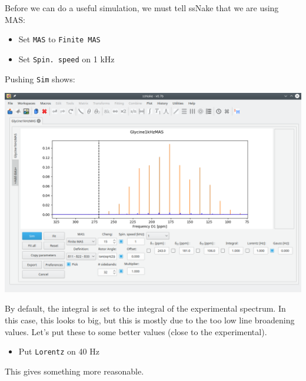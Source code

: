 \documentclass[11pt,a4paper]{article}
\begin{document}
Before we can do a useful simulation, we must tell ssNake that we are using MAS:
\begin{itemize}
  \item Set \texttt{MAS} to \texttt{Finite MAS}
  \item Set \texttt{Spin.\ speed} on 1 kHz
\end{itemize}
Pushing \texttt{Sim} shows:
\begin{center}
\includegraphics[width=0.8\linewidth]{Figs/Fig8.png}
\end{center}
By default, the integral is set to the integral of the experimental spectrum. In this case, this
looks to big, but this is mostly due to the too low line broadening values. Let's put these to some
better values (close to the experimental).
\begin{itemize}
  \item Put \texttt{Lorentz} on 40 Hz
\end{itemize}
This gives something more reasonable.
\end{document}
